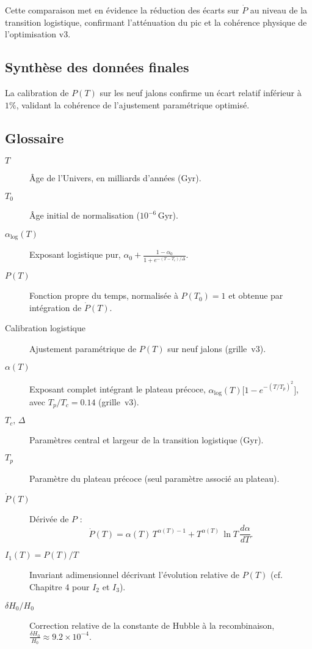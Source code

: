Cette comparaison met en évidence la réduction des écarts sur \(\dot P\)
au niveau de la transition logistique, confirmant l’atténuation du pic
et la cohérence physique de l’optimisation v3.

\subsection{Synthèse des données finales}

La calibration de \(P(T)\) sur les neuf jalons confirme un écart relatif
inférieur à \(1\%\), validant la cohérence de l’ajustement paramétrique optimisé.

\subsection{Glossaire}

\begin{description}
  \item[$T$] Âge de l’Univers, en milliards d’années (\(\mathrm{Gyr}\)).
  \item[$T_{0}$] Âge initial de normalisation (\(10^{-6}\)\,\(\mathrm{Gyr}\)).
  \item[$\alpha_{\mathrm{log}}(T)$] Exposant logistique pur,
    \(\displaystyle \alpha_{0}
      + \frac{1-\alpha_{0}}{1 + e^{-(T - T_{c})/\Delta}}\).
  \item[$P(T)$] Fonction propre du temps,
  normalisée à \(P(T_{0})=1\) et obtenue par intégration de \(\dot P(T)\).
  \item[Calibration logistique] Ajustement paramétrique de \(P(T)\) sur neuf jalons (grille~v3).
  \item[$\alpha(T)$] Exposant complet intégrant le plateau précoce,
    \(\displaystyle \alpha_{\mathrm{log}}(T)\bigl[1 - e^{-(T/T_{p})^{2}}\bigr]\),
    avec \(T_{p}/T_{c}=0.14\) (grille~v3).
  \item[$T_{c},\,\Delta$] Paramètres central et largeur de la transition logistique (Gyr).
  \item[$T_{p}$] Paramètre du plateau précoce (seul paramètre associé au plateau).
  \item[$\dot P(T)$] Dérivée de \(P\) :
    \[
      \dot P(T)
      = \alpha(T)\,T^{\alpha(T)-1}
      + T^{\alpha(T)}\,\ln T\,\frac{d\alpha}{dT}.
    \]
  \item[$I_{1}(T)=P(T)/T$] Invariant adimensionnel décrivant l’évolution relative de \(P(T)\) (cf. Chapitre 4 pour \(I_{2}\) et \(I_{3}\)).
  \item[$\delta H_{0}/H_{0}$] Correction relative de la constante de Hubble à la recombinaison,
    \(\displaystyle\frac{\delta H_{0}}{H_{0}}\approx9.2\times10^{-4}.\)
\end{description}
